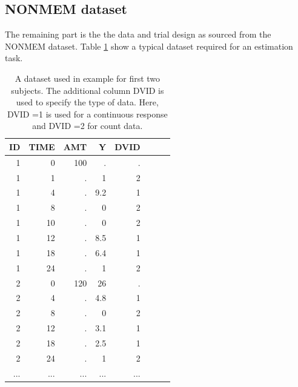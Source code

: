 \subsection{NONMEM dataset}
\label{sec:eg8-NONMEMdataset}
The remaining part is the the data and trial design as sourced from the 
NONMEM dataset. Table \ref{tab:example8_dataSet} show a typical dataset required for 
an estimation task.
\begin{table}[htdp]
\begin{center}
\small
\begin{tabular}{rrrrrrrr}\toprule
ID 	& TIME	& AMT	& Y		& DVID \\ \midrule
1 	& 0 		& 100 	& . 		& . \\ 
1 	& 1 		& . 		& 1	 	& 2 \\ 
1 	& 4 		& . 		& 9.2 	& 1 \\ 
1 	& 8 		& . 		& 0 		& 2 \\ 
1 	& 10		& . 		& 0	 	& 2 \\ 
1 	& 12 	& . 		& 8.5 	& 1 \\ 
1 	& 18 	& . 		& 6.4 	& 1 \\ 
1 	& 24 	& . 		& 1 		& 2 \\ 
2 	& 0 		& 120	&  26 	& . \\ 
2 	& 4 		& . 		& 4.8 	& 1 \\ 
2 	& 8 		& . 		& 0 		& 2 \\ 
2 	& 12 	& . 		& 3.1 	& 1 \\ 
2 	& 18 	& . 		& 2.5 	& 1 \\ 
2 	& 24 	& . 		& 1 		& 2 \\ 
...	& ...		& ...		& ...		& ...	\\ \bottomrule
\end{tabular}
\end{center}
\caption{A dataset used in example for first two subjects.
The additional column DVID is used to specify the type of data. Here, 
DVID =1 is used for a continuous response and DVID =2 for count data.}
\label{tab:example8_dataSet}
\end{table}%



